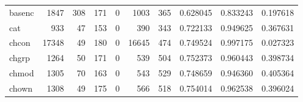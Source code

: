 \begin{tabular}{lrrrrrrrrr}
basenc    &                                1847 &                                             308 &                                            171 &                                             0 &                                           1003 &                                          365 &                                           0.628045 &                               0.833243 &                             0.197618 \\
cat       &                                 933 &                                              47 &                                            153 &                                             0 &                                            390 &                                          343 &                                           0.722133 &                               0.949625 &                             0.367631 \\
chcon     &                               17348 &                                              49 &                                            180 &                                             0 &                                          16645 &                                          474 &                                           0.749524 &                               0.997175 &                             0.027323 \\
chgrp     &                                1264 &                                              50 &                                            171 &                                             0 &                                            539 &                                          504 &                                           0.752373 &                               0.960443 &                             0.398734 \\
chmod     &                                1305 &                                              70 &                                            163 &                                             0 &                                            543 &                                          529 &                                           0.748659 &                               0.946360 &                             0.405364 \\
chown     &                                1308 &                                              49 &                                            175 &                                             0 &                                            566 &                                          518 &                                           0.754014 &                               0.962538 &                             0.396024 \\

\end{tabular}

